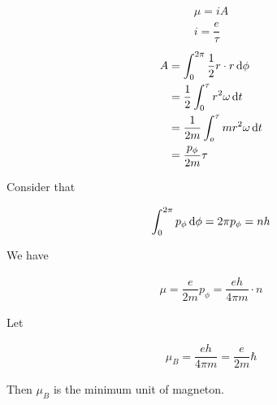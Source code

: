 \begin{equation*}
  \begin{aligned}
    \mu = i A \\
    i = \dfrac{e}{\tau} 
  \end{aligned}
\end{equation*}
\begin{equation*}
  \begin{aligned}
    A &= \int_0^{2 \pi} \dfrac{1}{2} r \cdot r \mathop{}\!\mathrm{d} \phi \\
    &= \dfrac{1}{2} \int_0^{\tau} r^2 \omega \mathop{}\!\mathrm{d} t \\
    &= \dfrac{1}{2 m} \int_o^{\tau} m r^2 \omega \mathop{}\!\mathrm{d} t \\
    &= \dfrac{p_{\phi}}{2 m} \tau 
  \end{aligned}
\end{equation*}

Consider that

\begin{equation*}
  \begin{aligned}
    \int_0^{2\pi} p_{\phi} \mathop{}\!\mathrm{d} \phi = 2\pi p_{\phi} = nh
  \end{aligned}
\end{equation*}

We have

\begin{equation*}
  \begin{aligned}
    \mu = \dfrac{e}{2 m} p_{\phi} = \dfrac{eh}{4 \pi m} \cdot n
  \end{aligned}
\end{equation*}

Let

\begin{equation}
  \begin{aligned}
    \mu_B = \dfrac{eh}{4 \pi m} = \dfrac{e}{2m} \hbar 
  \end{aligned}
\end{equation}

Then $\mu_B$ is the minimum unit of magneton.

